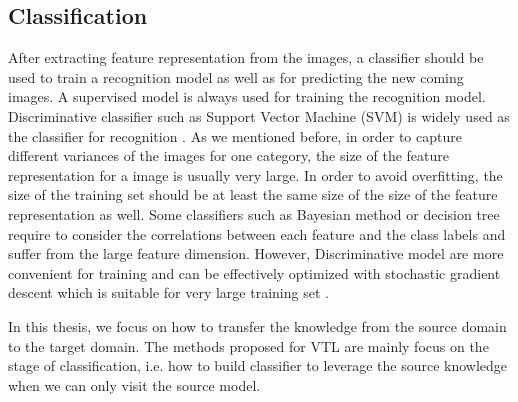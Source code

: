 \subsection{Classification}
After extracting feature representation from the images, a classifier should be used to train a recognition model as well as for predicting the new coming images. A supervised model is always used for training the recognition model. Discriminative classifier such as Support Vector Machine (SVM) is widely used as the classifier for recognition \cite{cristianini2000introduction}. As we mentioned before, in order to capture different variances of the images for one category, the size of the feature representation for a image is usually very large. In order to avoid overfitting, the size of the training set should be at least the same size of the size of the feature representation as well. Some classifiers such as Bayesian method or decision tree require to consider the correlations between each feature and the class labels and suffer from the large feature dimension. However, Discriminative model are more convenient for training and can be effectively optimized with stochastic gradient descent which is suitable for very large training set \cite{bottou2010large}.

In this thesis, we focus on how to transfer the knowledge from the source domain to the target domain. The methods proposed for VTL are mainly focus on the stage of classification, i.e. how to build classifier to leverage the source knowledge when we can only visit the source model.



